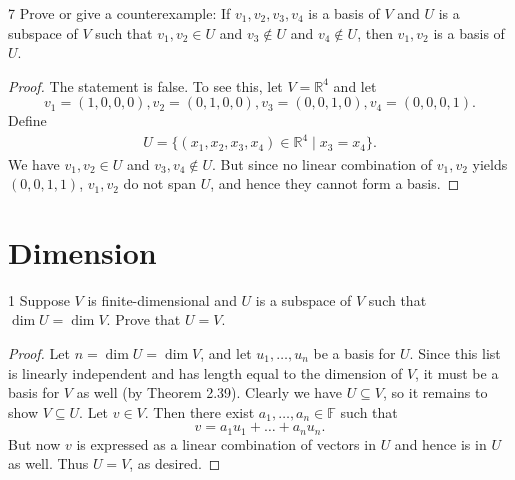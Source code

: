 \documentclass{extarticle}
\newenvironment{problem}[1]{\begin{prob*}{#1}{}}{\end{prob*}}
\newcommand{\R}{\mathbb{R}}
\newcommand{\F}{\mathbb{F}}
\begin{document}
\begin{problem}{7}
Prove or give a counterexample: If $v_1,v_2,v_3,v_4$ is a basis of $V$ and $U$ is a subspace of $V$ such that $v_1,v_2\in U$ and $v_3\not\in U$ and $v_4\not\in U$, then $v_1,v_2$ is a basis of $U$.
\end{problem}
\begin{proof}
The statement is false.  To see this, let $V = \R^4$ and let 
\begin{equation*}
v_1=(1,0,0,0), v_2=(0,1,0,0), v_3=(0,0,1,0), v_4=(0,0,0,1). 
\end{equation*} 
Define
\begin{align*}
U=\{(x_1,x_2,x_3,x_4)\in\R^4\mid x_3 = x_4\}.
\end{align*}
We have $v_1, v_2\in U$ and $v_3,v_4\not\in U$.  But since no linear combination of $v_1,v_2$ yields $(0, 0, 1, 1)$, $v_1,v_2$ do not span $U$, and hence they cannot form a basis. 
\end{proof}



\section{Dimension}

\begin{problem}{1}
Suppose $V$ is finite-dimensional and $U$ is a subspace of $V$ such that $\dim{U} = \dim{V}$.  Prove that $U=V$.
\end{problem}
\begin{proof}
Let $n=\dim{U}=\dim{V}$, and let $u_1,\dots, u_n$ be a basis for $U$.  Since this list is linearly independent and has length equal to the dimension of $V$, it must be a basis for $V$ as well (by Theorem 2.39).  Clearly we have $U\subseteq V$, so it remains to show $V\subseteq U$.  Let $v\in V$.  Then there exist $a_1,\dots,a_n\in\F$ such that 
\begin{equation*}
v = a_1u_1 + \dots + a_nu_n.
\end{equation*}
But now $v$ is expressed as a linear combination of vectors in $U$ and hence is in $U$ as well.  Thus $U=V$, as desired.
\end{proof}
\end{document}
